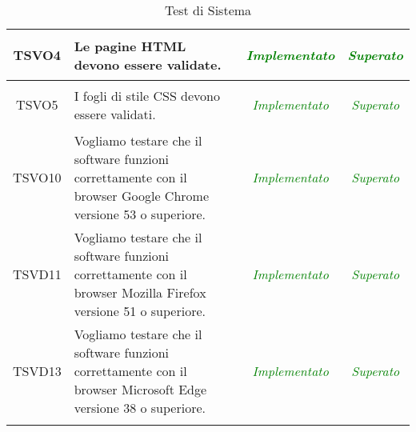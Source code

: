 \begin{longtable}{|c|>{}m{8cm}|c|c|}
\hypertarget{TSVO4}{TSVO4} & Le pagine HTML devono essere validate. &		\textcolor{green}{\textit{Implementato}} & \textcolor{green}{\textit{Superato}}\\ \hline
\hypertarget{TSVO5}{TSVO5} & I fogli di stile CSS devono essere validati. &		\textcolor{green}{\textit{Implementato}} & \textcolor{green}{\textit{Superato}}\\ \hline
\hypertarget{TSVO10}{TSVO10} & Vogliamo testare che il software funzioni correttamente con il browser Google Chrome versione 53 o superiore. &		\textcolor{green}{\textit{Implementato}} & \textcolor{green}{\textit{Superato}}\\ \hline
\hypertarget{TSVD11}{TSVD11} & Vogliamo testare che il software funzioni correttamente con il browser Mozilla Firefox versione 51 o superiore. &		\textcolor{green}{\textit{Implementato}} & \textcolor{green}{\textit{Superato}}\\ \hline
\hypertarget{TSVD13}{TSVD13} & Vogliamo testare che il software funzioni correttamente con il browser Microsoft Edge versione 38 o superiore. &		\textcolor{green}{\textit{Implementato}} & \textcolor{green}{\textit{Superato}}\\ \hline
\caption[Test di Sistema]{Test di Sistema}
\label{tabella:test1}
\end{longtable}
\clearpage

